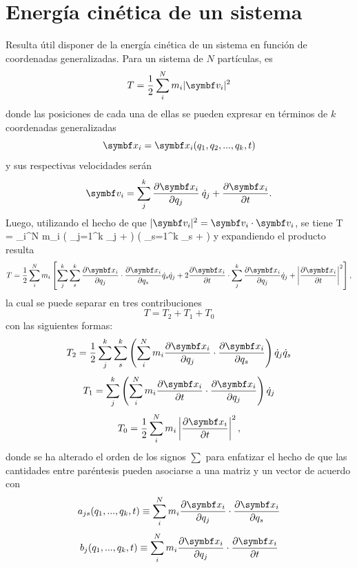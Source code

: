 \documentclass[10pt,oneside]{CBFT_book}
\begin{document}
\section{Energía cinética de un sistema}

Resulta útil disponer de la energía cinética de un sistema en función de coordenadas generalizadas.
Para un sistema de $N$ partículas, es 
\[
	T = \frac{1}{2} \sum_i^N m_i |\vb{v}_i|^2 
\]
donde las posiciones de cada una de ellas se pueden expresar en términos de $k$ coordenadas generalizadas
\[
	\vb{x}_i = \vb{x}_i(q_1, q_2, ..., q_k, t )
\]
y sus respectivas velocidades serán
\[
	\vb{v}_i = \sum_j^{k}  \dpar{\vb{x}_i}{q_j} \: \dot{q}_j + \dpar{\vb{x}_i}{t}.
\]
Luego, utilizando el hecho de que $ |\vb{v}_i|^2 = \vb{v}_i \cdot \vb{v}_i $, se tiene 
\be
	T =  \sum_i^N m_i \left( \sum_{j=1}^{k}  _j +  \right)
	\cdot \left( \sum_{s=1}^{k} _s +  \right) 
\label{mc_T}
\ee
y expandiendo el producto resulta
\[
	T = \frac{1}{2} \sum_i^N m_i \left[ \sum_j^{k}\sum_s^{k} \dpar{\vb{x}_i}{q_j} \cdot \dpar{\vb{x}_i}{q_s}\dot{q}_s\dot{q}_j + 
	2 \dpar{\vb{x}_i}{t} \cdot \sum_j^{k} \dpar{\vb{x}_i}{q_j}\dot{q}_j + \left| \dpar{\vb{x}_i}{t} \right|^2 \right],
\]
la cual se puede separar en tres contribuciones
\[
	T = T_2 + T_1 + T_0
\]
con las siguientes formas:
\[
	T_2 = \frac{1}{2} \sum_j^{k} \sum_s^{k} \left( \sum_i^N m_i \dpar{\vb{x}_i}{q_j} \cdot \dpar{\vb{x}_i}{q_s} \right) \dot{q}_j\dot{q}_s
\]
\[
	T_1 =  \sum_j^{k} \left( \sum_i^N m_i \dpar{\vb{x}_i}{t} \cdot \dpar{\vb{x}_i}{q_j} \right) \dot{q}_j
\]
\[
	T_0 = \frac{1}{2} \sum_i^N m_i \left| \dpar{\vb{x}_i}{t} \right|^2,
\]
donde se ha alterado el orden de los signos $\sum$ para enfatizar el hecho de que las cantidades entre paréntesis pueden asociarse
a una matriz y un vector de acuerdo con 
\[
	a_{js}(q_1,...,q_k,t) \equiv \sum_i^N  m_i \dpar{\vb{x}_i}{q_j} \cdot \dpar{\vb{x}_i}{q_s}
\]
\[
	b_j(q_1,...,q_k,t) \equiv \sum_i^N  m_i \dpar{\vb{x}_i}{q_j} \cdot \dpar{\vb{x}_i}{t}
\]
\end{document}
